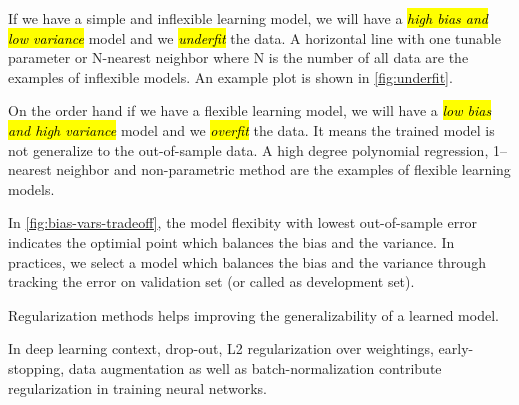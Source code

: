 \documentclass{kthreport}
\begin{document}
If we have a simple and inflexible learning model, we will have
a \emph{\hl{high bias and low variance}} model and we \emph{\hl{underfit}} the data.
A horizontal line with one tunable parameter or N-nearest neighbor
where N is the number of all data are the examples of inflexible models.
An example plot is shown in \cref{fig:underfit}.

On the order hand if we have a flexible learning model,
we will have a \emph{\hl{low bias and high variance}} model and we \emph{\hl{overfit}} the data.
It means the trained model is not generalize to the out-of-sample data. A high
degree polynomial regression, 1--nearest neighbor and non-parametric method are the
examples of flexible learning models.

In \cref{fig:bias-vars-tradeoff}, the model flexibity with lowest out-of-sample
error indicates the optimial point which balances the bias and the variance.
In practices, we select a model which balances the bias and the variance through
tracking the error on validation set (or called as development set).

Regularization methods helps improving the generalizability of a learned model.

In deep learning context, drop-out, L2 regularization over weightings, early-stopping,
data augmentation as well as batch-normalization
contribute regularization in training neural networks. \cite{luo2018-bn-regularization}
\end{document}
